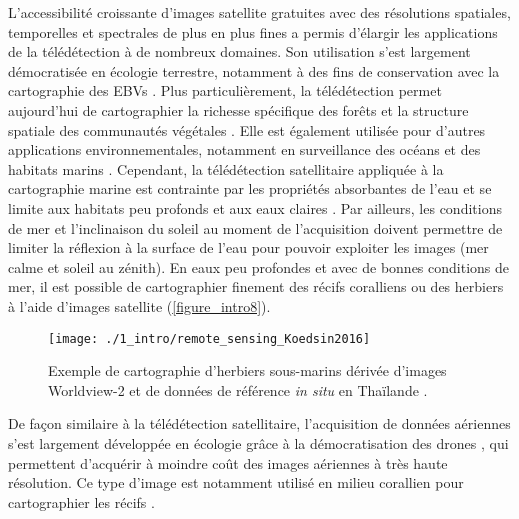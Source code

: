 L’accessibilité croissante d’images satellite gratuites avec des résolutions spatiales, temporelles et spectrales de plus en plus fines a permis d’élargir les applications de la télédétection à de nombreux domaines. Son utilisation s’est largement démocratisée en écologie terrestre, notamment à des fins de conservation avec la cartographie des EBVs \citep{pettorelli_framing_2016, luque_improving_2018, jetz_essential_2019}. Plus particulièrement, la télédétection permet aujourd’hui de cartographier la richesse spécifique des forêts \citep{feret_mapping_2014, vaglio_laurin_biodiversity_2014, baldeck_operational_2015} et la structure spatiale des communautés végétales \citep{rocchini_measuring_2018}. Elle est également utilisée pour d’autres applications environnementales, notamment en surveillance des océans \citep{devi_applications_2015} et des habitats marins \citep{hedley_remote_2016, mccarthy_satellite_2017, appolloni_use_2020, purkis_remote_2018}. Cependant, la télédétection satellitaire appliquée à la cartographie marine est contrainte par les propriétés absorbantes de l’eau et se limite aux habitats peu profonds et aux eaux claires \citep{purkis_remote_2018}. Par ailleurs, les conditions de mer et l’inclinaison du soleil au moment de l’acquisition doivent permettre de limiter la réflexion à la surface de l’eau pour pouvoir exploiter les images (mer calme et soleil au zénith). En eaux peu profondes et avec de bonnes conditions de mer, il est possible de cartographier finement des récifs coralliens ou des herbiers à l’aide d’images satellite (\autoref{figure_intro8}).

\begin{figure}[H]
	\begin{center}
	\texttt{[image: ./1\_intro/remote\_sensing\_Koedsin2016]}
		\caption[Exemple de cartographie d’herbiers sous-marins par télédétection]{Exemple de cartographie d’herbiers sous-marins dérivée d’images Worldview-2 et de données de référence \textit{in situ} en Thaïlande \citep{koedsin_integrated_2016}.}
	\label{figure_intro8}
\end{center}
\end{figure}

De façon similaire à la télédétection satellitaire, l’acquisition de données aériennes s’est largement développée en écologie grâce à la démocratisation des drones \citep{ivosevic_use_2015}, qui permettent d’acquérir à moindre coût des images aériennes à très haute résolution. Ce type d’image est notamment utilisé en milieu corallien pour cartographier les récifs \citep{casella_mapping_2017, collin_very_2018}.

